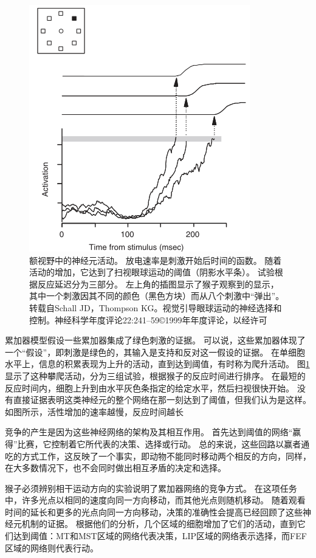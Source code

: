 \begin{figure}[!htb]
	\centering
	\includegraphics{image_pfc/Fig_3_4}
	\caption{额视野中的神经元活动。
		放电速率是刺激开始后时间的函数。
		随着活动的增加，它达到了扫视眼球运动的阈值（阴影水平条）。
		试验根据反应延迟分为三部分。
		左上角的插图显示了猴子观察到的显示，其中一个刺激因其不同的颜色（黑色方块）而从八个刺激中“弹出”。
		转载自Schall JD，Thompson KG。视觉引导眼球运动的神经选择和控制。神经科学年度评论22:241–59©1999年年度评论，以经许可}
	\label{fig:3_4}
\end{figure}


累加器模型假设一些累加器集成了绿色刺激的证据。
可以说，这些累加器体现了一个“假设”，即刺激是绿色的，其输入是支持和反对这一假设的证据。
在单细胞水平上，信息的积累表现为上升的活动，直到达到阈值，有时称为爬升活动。
图\ref{fig:3_4}显示了这种攀爬活动，分为三组试验，根据猴子的反应时间进行排序。
在最短的反应时间内，细胞上升到由水平灰色条指定的给定水平，然后扫视很快开始。
没有直接证据表明这类神经元的整个网络在那一刻达到了阈值，但我们认为是这样。
如图所示，活性增加的速率越慢，反应时间越长\par


竞争的产生是因为这些神经网络的架构及其相互作用。
首先达到阈值的网络“赢得”比赛，它控制着它所代表的决策、选择或行动。
总的来说，这些回路以赢者通吃的方式工作，这反映了一个事实，即动物不能同时移动两个相反的方向，同样，在大多数情况下，也不会同时做出相互矛盾的决定和选择。\par


猴子必须辨别相干运动方向的实验说明了累加器网络的竞争方式。
在这项任务中，许多光点以相同的速度向同一方向移动，而其他光点则随机移动。
随着观看时间的延长和更多的光点向同一方向移动，决策的准确性会提高\cite{schall2001neural}已经回顾了这些神经元机制的证据。
根据他们的分析，几个区域的细胞增加了它们的活动，直到它们达到阈值：MT和MST区域的网络代表决策，LIP区域的网络表示选择，而FEF区域的网络则代表行动\cite{kim1999neural}。\par


